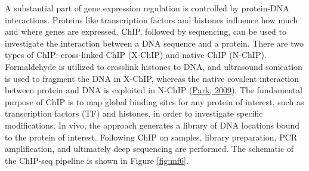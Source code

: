 \documentclass[12pt,twoside]{reedthesis}
\begin{document}
A substantial part of gene expression regulation is controlled by
protein-DNA interactions. Proteins like transcription factors and
histones influence how much and where genes are expressed. ChIP,
followed by sequencing, can be used to investigate the interaction
between a DNA sequence and a protein. There are two types of ChIP:
cross-linked ChIP (X-ChIP) and native ChIP (N-ChIP). Formaldehyde is
utilized to crosslink histones to DNA, and ultrasound sonication is used
to fragment the DNA in X-ChIP, whereas the native covalent interaction
between protein and DNA is exploited in N-ChIP (\protect\hyperlink{ref-park2009}{Park, 2009}). The
fundamental purpose of ChIP is to map global binding sites for any
protein of interest, such as transcription factors (TF) and histones, in
order to investigate specific modifications. In vivo, the approach
generates a library of DNA locations bound to the protein of interest.
Following ChIP on samples, library preparation, PCR amplification, and
ultimately deep sequencing are performed. The schematic of the ChIP-seq pipeline
is shown in Figure \ref{fig:mf6}.
\end{document}
